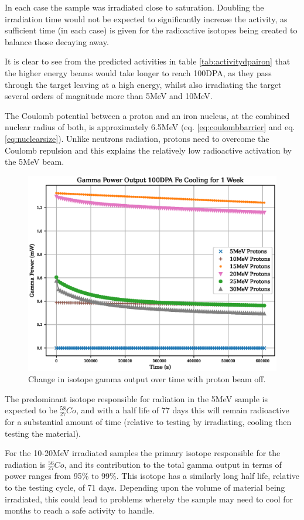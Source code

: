 In each case the sample was irradiated close to saturation.  Doubling the irradiation time would not be expected to significantly increase the activity, as sufficient time (in each case) is given for the radioactive isotopes being created to balance those decaying away. 

It is clear to see from the predicted activities in table \ref{tab:activitydpairon} that the higher energy beams would take longer to reach 100DPA, as they pass through the target leaving at a high energy, whilst also irradiating the target several orders of magnitude more than 5MeV and 10MeV.

The Coulomb potential between a proton and an iron nucleus, at the combined nuclear radius of both, is approximately 6.5MeV (eq. \ref{eq:coulombbarrier} and eq. \ref{eq:nuclearsize}).  Unlike neutrons radiation, protons need to overcome the Coulomb repulsion and this explains the relatively low radioactive activation by the 5MeV beam.  

\begin{figure}[htb]
\centering
\includegraphics[width=0.7\linewidth]{chapters/activity_code/fe_100dpa/cooling.eps}
\caption{Change in isotope gamma output over time with proton beam off.}
\label{fig:activity-v2-residual-b}
\end{figure}

The predominant isotope responsible for radiation in the 5MeV sample is expected to be ${}^{58}_{27}Co$, and with a half life of 77 days this will remain radioactive for a substantial amount of time (relative to testing by irradiating, cooling then testing the material).

For the 10-20MeV irradiated samples the primary isotope responsible for the radiation is ${}^{56}_{27}Co$, and its contribution to the total gamma output in terms of power ranges from 95\% to 99\%.  This isotope has a similarly long half life, relative to the testing cycle, of 71 days.  Depending upon the volume of material being irradiated, this could lead to problems whereby the sample may need to cool for months to reach a safe activity to handle.

